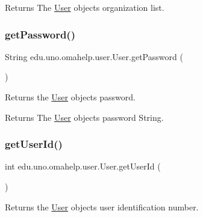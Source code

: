 \begin{DoxyReturn}{Returns}
The \mbox{\hyperlink{classedu_1_1uno_1_1omahelp_1_1user_1_1_user}{User}} object\textquotesingle{}s organization list. 
\end{DoxyReturn}
\mbox{\label{classedu_1_1uno_1_1omahelp_1_1user_1_1_user_aa90125f1dd5f6db3cacee624d4b774a3}} 
\subsubsection{\texorpdfstring{get\+Password()}{getPassword()}}
{\footnotesize\ttfamily String edu.\+uno.\+omahelp.\+user.\+User.\+get\+Password (\begin{DoxyParamCaption}{ }\end{DoxyParamCaption})}

Returns the \mbox{\hyperlink{classedu_1_1uno_1_1omahelp_1_1user_1_1_user}{User}} object\textquotesingle{}s password.

\begin{DoxyReturn}{Returns}
The \mbox{\hyperlink{classedu_1_1uno_1_1omahelp_1_1user_1_1_user}{User}} object\textquotesingle{}s password String. 
\end{DoxyReturn}
\mbox{\label{classedu_1_1uno_1_1omahelp_1_1user_1_1_user_ac6292daa9dbf659897c0737125898cfb}} 
\subsubsection{\texorpdfstring{get\+User\+Id()}{getUserId()}}
{\footnotesize\ttfamily int edu.\+uno.\+omahelp.\+user.\+User.\+get\+User\+Id (\begin{DoxyParamCaption}{ }\end{DoxyParamCaption})}

Returns the \mbox{\hyperlink{classedu_1_1uno_1_1omahelp_1_1user_1_1_user}{User}} object\textquotesingle{}s user identification number.

